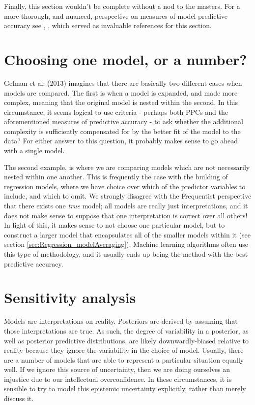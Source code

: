 \documentclass[11pt,fullpage]{book}
\begin{document}
Finally, this section wouldn't be complete without a nod to the masters. For a more thorough, and nuanced, perspective on measures of model predictive accuracy see \cite{gelman2013bayesian}, \cite{gelman2014understanding}, which served as invaluable references for this section.

\section{Choosing one model, or a number?}
Gelman et al. (2013) imagines that there are basically two different cases when models are compared. The first is when a model is expanded, and made more complex, meaning that the original model is nested within the second. In this circumstance, it seems logical to use criteria - perhaps both PPCs and the aforementioned measures of predictive accuracy - to ask whether the additional complexity is sufficiently compensated for by the better fit of the model to the data? For either answer to this question, it probably makes sense to go ahead with a single model. 

The second example, is where we are comparing models which are not necessarily nested within one another. This is frequently the case with the building of regression models, where we have choice over which of the predictor variables to include, and which to omit. We strongly disagree with the Frequentist perspective that there exists one \textit{true} model; all models are really just interpretations, and it does not make sense to suppose that one interpretation is correct over all others! In light of this, it makes sense to not choose one particular model, but to construct a larger model that encapsulates all of the smaller models within it (see section \ref{sec:Regression_modelAveraging}). Machine learning algorithms often use this type of methodology, and it usually ends up being the method with the best predictive accuracy. 

\section{Sensitivity analysis}
Models are interpretations on reality. Posteriors are derived by assuming that those interpretations are true. As such, the degree of variability in a posterior, as well as posterior predictive distributions, are likely downwardly-biased relative to reality because they ignore the variability in the choice of model. Usually, there are a number of models that are able to represent a particular situation equally well. If we ignore this source of uncertainty, then we are doing ourselves an injustice due to our intellectual overconfidence. In these circumstances, it is sensible to try to model this epistemic uncertainty explicitly, rather than merely discuss it. 
\end{document}

